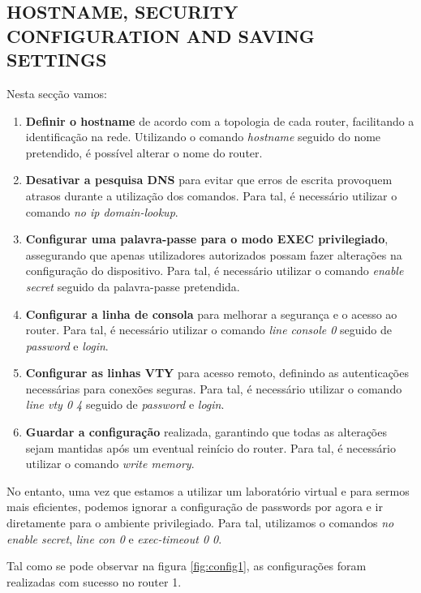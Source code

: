 \documentclass[11pt,english, openright, oneside]{book}
\begin{document}
\subsection{HOSTNAME, SECURITY CONFIGURATION AND SAVING SETTINGS}
\vspace{0.2cm}

Nesta secção vamos:

\begin{enumerate}
  \item \textbf{Definir o hostname} de acordo com a topologia de cada router, facilitando a identificação na rede. Utilizando o comando \textit{hostname} seguido do nome pretendido, é possível alterar o nome do router.
  \item \textbf{Desativar a pesquisa DNS} para evitar que erros de escrita provoquem atrasos durante a utilização dos comandos. Para tal, é necessário utilizar o comando \textit{no ip domain-lookup}.
  \item \textbf{Configurar uma palavra-passe para o modo EXEC privilegiado}, assegurando que apenas utilizadores autorizados possam fazer alterações na configuração do dispositivo. Para tal, é necessário utilizar o comando \textit{enable secret} seguido da palavra-passe pretendida.
  \item \textbf{Configurar a linha de consola} para melhorar a segurança e o acesso ao router. Para tal, é necessário utilizar o comando \textit{line console 0} seguido de \textit{password} e \textit{login}.
  \item \textbf{Configurar as linhas VTY} para acesso remoto, definindo as autenticações necessárias para conexões seguras. Para tal, é necessário utilizar o comando \textit{line vty 0 4} seguido de \textit{password} e \textit{login}.
  \item \textbf{Guardar a configuração} realizada, garantindo que todas as alterações sejam mantidas após um eventual reinício do router. Para tal, é necessário utilizar o comando \textit{write memory}.
\end{enumerate}
\vspace{0.2cm}

No entanto, uma vez que estamos a utilizar um laboratório virtual e para sermos mais eficientes, podemos ignorar a configuração de passwords por agora e ir diretamente para o ambiente privilegiado. Para tal, utilizamos o comandos \textit{no enable secret}, \textit{line con 0} e \textit{exec-timeout 0 0}.

\vspace{0.2cm}
Tal como se pode observar na figura \ref{fig:config1}, as configurações foram realizadas com sucesso no router 1.
\vspace{0.2cm}
\end{document}
